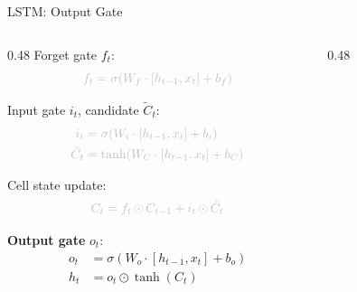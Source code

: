 \begin{frame}{LSTM: Output Gate}
  \begin{columns}[T]
    \begin{column}{0.48\textwidth}
      \textcolor{gray!50}{Forget gate $f_t$:}
      \[
        \textcolor{gray!50}{f_t = \sigma\!\left(W_f \cdot [h_{t-1}, x_t] + b_f\right)}
      \]

      \textcolor{gray!50}{Input gate $i_t$, candidate $\tilde{C}_t$:}
      \[
      \textcolor{gray!50}{
      \begin{aligned}
        i_t &= \sigma\!\left(W_i \cdot [h_{t-1}, x_t] + b_i\right) \\
        \tilde{C}_t &= \tanh\!\left(W_C \cdot [h_{t-1}, x_t] + b_C\right)
      \end{aligned}
      }
      \]

      \textcolor{gray!50}{Cell state update:}
      \[
        \textcolor{gray!50}{C_t = f_t \odot C_{t-1} + i_t \odot \tilde{C}_t}
      \]

      \textbf{Output gate} $o_t$:
      \[
      \begin{aligned}
        o_t &= \sigma\!\left(W_o \cdot [h_{t-1}, x_t] + b_o\right) \\
        h_t &= o_t \odot \tanh(C_t)
      \end{aligned}
      \]
    \end{column}
    \begin{column}{0.48\textwidth}
      \begin{center}
      \end{center}
    \end{column}
  \end{columns}
\end{frame}

